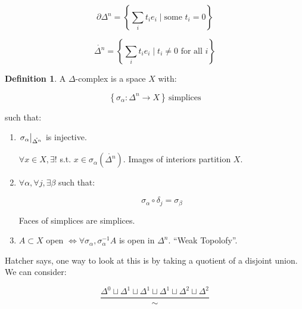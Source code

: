 \documentclass{article}
\theoremstyle{definition}
\newtheorem*{definition}{Definition}
\begin{document}
    \[
        \partial \Delta^n = \left\{ \sum_{i} t_i e_i \mid \text{some } t_i = 0 \right\} 
    \]

    \[
        \mathring{\Delta^n} = \left\{ \sum_{i} t_i e_i \mid t_i\neq 0 \text{ for all } i \right\} 
    \]

    \begin{definition}
        A \(\Delta\)-complex is a space \(X\) with:

        \[
            \left\{ \sigma_\alpha : \Delta^n \to X \right\} \, \text{simplices} 
        \]

        such that:

        \begin{enumerate}[label=\roman*)]
            \item \(\eval{\sigma_\alpha}_{\mathring{\Delta^n}}\) is injective.
            
            \(\forall x\in X, \exists !\) s.t. \(x\in \sigma_\alpha(\mathring{\Delta^n})\). Images of interiors partition \(X\).

            \item \(\forall \alpha, \forall j, \exists \beta\) such that:
            
            \[
                \sigma_\alpha \circ \delta_j = \sigma_\beta
            \]

            Faces of simplices are simplices.

            \item \(A \subset X\) open \(\iff \forall \sigma_\alpha, \sigma_\alpha ^{-1} A\) is open in \(\Delta^n\). ``Weak Topolofy''.
        \end{enumerate} 


    \end{definition}

    Hatcher says, one way to look at this is by taking a quotient of a disjoint union. We can consider:

    \[
        \frac{\Delta^0 \sqcup \Delta^1 \sqcup \Delta^1 \sqcup \Delta^1 \sqcup \Delta^2 \sqcup \Delta^2}{\sim}
    \]
\end{document}
